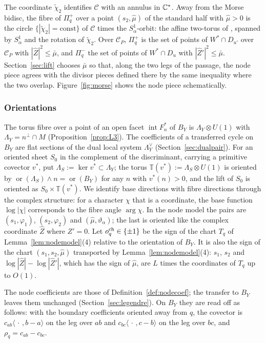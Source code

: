The coordinate $\tilde\chi_2$ identifies $\mathscr C$ with an annulus in $\mathbb C^*$. Away from the Morse bidisc, the fibre of
$\Pi_q^+$ over a point $(s_2,\hat\mu)$ of the standard half with $\hat\mu>0$ is the circle $\{|\tilde\chi_2|=\mathrm{const}\}$
of $\mathscr C$ times the $S^1_\alpha$-orbit: the affine two-torus of \cite[Lemma~5.14]{CBM}, spanned by $S^1_\alpha$ and the
rotation of $\tilde\chi_2$. Over $\mathscr C_P$, $\Pi_q^+$ is the set of points of $W^*\cap D_{u'}$ over $\mathscr C_P$ with
$|\hat Z|^2\le\bar\mu$, and $\Pi^-_q$ the set of points of $W^*\cap D_u$ with $|\hat Z'|^2\le\bar\mu$. Section~\ref{sec:lift} chooses $\bar\mu$
so that, along the two legs of the passage, the node piece agrees with the divisor pieces defined there by the same
inequality where the two overlap. Figure~\ref{fig:morse} shows the node piece schematically.

\subsubsection*{Orientations}
The torus fibre over a point of an open facet $\operatorname{int}F^*_n$ of $B_Y$ is $\Lambda_Y\otimes U(1)$ with
$\Lambda_Y=n^\perp\cap M$ (Proposition~\ref{prop:L3}). The coefficients of a transferred cycle on $B_Y$ are flat sections
of the dual local system $\Lambda_Y^\vee$ (Section~\ref{sec:dualpair}). For an oriented sheet $S_0$ in the complement of
the discriminant, carrying a primitive covector $v^*$, put $\Lambda_S:=\ker v^*\subset\Lambda_Y$; the torus
$\mathbb T(v^*):=\Lambda_S\otimes U(1)$ is oriented by $\operatorname{or}(\Lambda_S)\wedge n=\operatorname{or}(B_Y)$ for any $n$
with $v^*(n)>0$, and the lift of $S_0$ is oriented as $S_0\times\mathbb T(v^*)$. We identify base directions with fibre
directions through the complex structure: for a character $\chi$ that is a coordinate, the base function $\log|\chi|$
corresponds to the fibre angle $\arg\chi$. In the node model the pairs are $(s_1,\varphi_1)$, $(s_2,\varphi_2)$ and
$(\hat\mu,\vartheta_\alpha)$; the last is oriented like the complex coordinate $\hat Z$ where $Z'=0$. Let
$o^{\rm ch}_q\in\{\pm1\}$ be the sign of the chart $T_q$ of Lemma~\ref{lem:nodemodel}(4) relative to the orientation of
$B_Y$. It is also the sign of the chart $(s_1,s_2,\hat\mu)$ transported by Lemma~\ref{lem:nodemodel}(4): $s_1$, $s_2$ and
$\log|\hat Z|-\log|\hat Z'|$, which has the sign of $\hat\mu$, are $L$ times the coordinates of $T_q$ up to $O(1)$.

The node coefficients are those of Definition~\ref{def:nodecoef}; the transfer to $B_Y$ leaves them unchanged
(Section~\ref{sec:legendre}). On $B_Y$ they are read off as follows: with the boundary coefficients oriented away from
$q$, the covector is $c_{ab}\langle\,\cdot\,,b-a\rangle$ on the leg over $ab$ and $c_{bc}\langle\,\cdot\,,c-b\rangle$ on the
leg over $bc$, and $\rho_q=c_{ab}-c_{bc}$.

